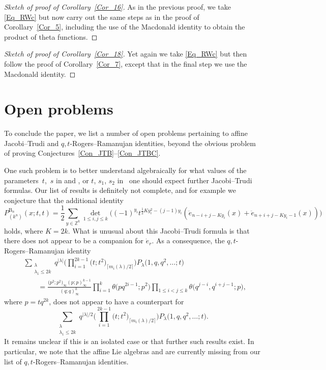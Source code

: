 \documentclass[pdftex]{sigma}
\numberwithin{equation}{section}
\renewcommand{\leq}{\leqslant}
\newcommand{\ceil}[1]{\lceil#1\rceil}
\newcommand{\abs}[1]{\vert#1\vert}
\newcommand{\la}{\lambda}
\begin{document}
\begin{proof}[Sketch of proof of Corollary~\ref{Cor_16}]
As in the previous proof, we take \eqref{Eq_RWc} but now carry out the
same steps as in the proof of Corollary~\ref{Cor_5}, including the
use of the  Macdonald identity to obtain the
product of theta functions.
\end{proof}

\begin{proof}[Sketch of proof of Corollary~\ref{Cor_18}]
Yet again we take \eqref{Eq_RWc} but then follow the proof of
Corollary~\ref{Cor_7}, except that in the final step we use the
 Macdonald identity.
\end{proof}

\section{Open problems}\label{Sec_open}

To conclude the paper, we list a number of open problems pertaining to
affine Jacobi--Trudi and $q,t$-Rogers--Ramanujan identities,
beyond the obvious problem of proving
Conjectures~\ref{Con_JTB}--\ref{Con_JTBC}.

One such problem is to better understand algebraically for what values
of the parameters~$t$,~$s$ in  and
, or
$t$, $s_1$, $s_2$ in~
one should expect further Jacobi--Trudi formulas.
Our list of results is definitely not complete, and for example we
conjecture that the additional  identity
\[
P_{(k^n)}^{\mathrm{B}_n}(x;t,t)
=\frac{1}{2}\sum_{y\in\mathbb{Z}^k} \det_{1\leq i,j\leq k}\bigl(
(-1)^{y_i} t^{\frac{1}{2}Ky_i^2-(j-1)y_i} (
\ddot{e}_{n-i+j-Ky_i}(x)+\ddot{e}_{n+i+j-Ky_i-1}(x) )\bigr)
\]
holds, where $K=2k$.
What is unusual about this Jacobi--Trudi formula is that there does not
appear to be a companion for $\dot{e}_r$.
As a consequence, the $q,t$-Rogers--Ramanujan identity
\begin{align*}
&\sum_{\substack{\la \\[1pt] \la_1\leq 2k}}
q^{\abs{\la}}
\Biggl(\prod_{i=1}^{2k-1} \bigl(t;t^2\bigr)_{\ceil{m_i(\la)/2}}\Biggr)
 P_{\la}\bigl(1,q,q^2,\dots;t\bigr) \\
&\qquad=\frac{\bigl(p^2;p^2\bigr)_{\infty}(p;p)_{\infty}^{k-1}}
{(q;q)_{\infty}^k}
\prod_{i=1}^k \theta\bigl(pq^{2i-1};p^2\bigr)
\prod_{1\leq i<j\leq k}
\theta\bigl(q^{j-i},q^{i+j-1};p\bigr),
\end{align*}
where $p=tq^{2k}$, does not appear to have a counterpart for
\[
\sum_{\substack{\la \\[1pt] \la_1\leq 2k}}
q^{\abs{\la}/2}
\Biggl(\prod_{i=1}^{2k-1} \bigl(t;t^2\bigr)_{\ceil{m_i(\la)/2}}\Biggr)
P_{\la}\bigl(1,q,q^2,\dots;t\bigr).
\]
It remains unclear if this is an isolated case or that further
such results exist.
In particular, we note that the affine Lie algebras
 and  are currently
missing from our list of $q,t$-Rogers--Ramanujan identities.
\end{document}
